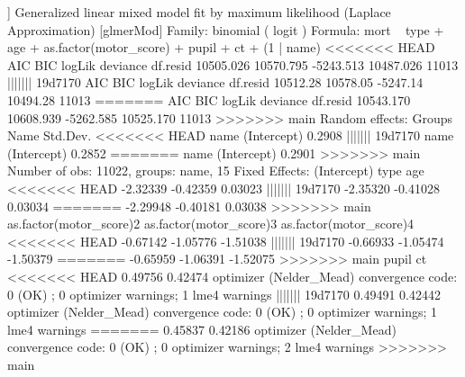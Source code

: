 \documentclass[
]{jss}
\begin{document}
\begin{CodeChunk}
\begin{CodeOutput}
[[3]]
Generalized linear mixed model fit by maximum likelihood (Laplace
  Approximation) [glmerMod]
 Family: binomial  ( logit )
Formula: mort ~ type + age + as.factor(motor_score) + pupil + ct + (1 |  
    name)
<<<<<<< HEAD
      AIC       BIC    logLik  deviance  df.resid 
10505.026 10570.795 -5243.513 10487.026     11013 
||||||| 19d7170
     AIC      BIC   logLik deviance df.resid 
10512.28 10578.05 -5247.14 10494.28    11013 
=======
      AIC       BIC    logLik  deviance  df.resid 
10543.170 10608.939 -5262.585 10525.170     11013 
>>>>>>> main
Random effects:
 Groups Name        Std.Dev.
<<<<<<< HEAD
 name   (Intercept) 0.2908  
||||||| 19d7170
 name   (Intercept) 0.2852  
=======
 name   (Intercept) 0.2901  
>>>>>>> main
Number of obs: 11022, groups:  name, 15
Fixed Effects:
            (Intercept)                     type                      age  
<<<<<<< HEAD
               -2.32339                 -0.42359                  0.03023  
||||||| 19d7170
               -2.35320                 -0.41028                  0.03034  
=======
               -2.29948                 -0.40181                  0.03038  
>>>>>>> main
as.factor(motor_score)2  as.factor(motor_score)3  as.factor(motor_score)4  
<<<<<<< HEAD
               -0.67142                 -1.05776                 -1.51038  
||||||| 19d7170
               -0.66933                 -1.05474                 -1.50379  
=======
               -0.65959                 -1.06391                 -1.52075  
>>>>>>> main
                  pupil                       ct  
<<<<<<< HEAD
                0.49756                  0.42474  
optimizer (Nelder_Mead) convergence code: 0 (OK) ; 0 optimizer warnings; 1 lme4 warnings 
||||||| 19d7170
                0.49491                  0.42442  
optimizer (Nelder_Mead) convergence code: 0 (OK) ; 0 optimizer warnings; 1 lme4 warnings 
=======
                0.45837                  0.42186  
optimizer (Nelder_Mead) convergence code: 0 (OK) ; 0 optimizer warnings; 2 lme4 warnings 
>>>>>>> main


\end{CodeOutput}
\end{CodeChunk}
\end{document}
